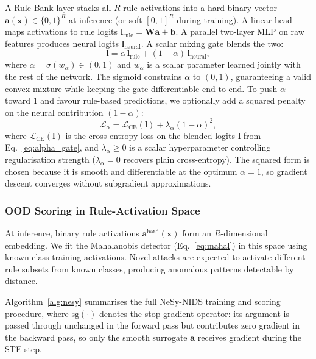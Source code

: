\documentclass[journal]{IEEEtran}
\begin{document}
A Rule Bank layer stacks all $R$ rule activations into a hard binary
vector $\mathbf{a}(\mathbf{x})\in\{0,1\}^R$ at inference (or soft
$[0,1]^R$ during training). A linear head maps activations to rule
logits $\mathbf{l}_{\mathrm{rule}}{=}\mathbf{W}\mathbf{a}{+}\mathbf{b}$.
A parallel two-layer MLP on raw features produces neural logits
$\mathbf{l}_{\mathrm{neural}}$. A scalar mixing gate blends the two:
\begin{equation}
  \mathbf{l} = \alpha\,\mathbf{l}_{\mathrm{rule}} +
               (1{-}\alpha)\,\mathbf{l}_{\mathrm{neural}},
  \label{eq:alpha_gate}
\end{equation}
where $\alpha{=}\sigma(w_\alpha)\in(0,1)$ and $w_\alpha$ is a scalar
parameter learned jointly with the rest of the network. The sigmoid
constrains $\alpha$ to $(0,1)$, guaranteeing a valid convex mixture
while keeping the gate differentiable end-to-end.
To push $\alpha$ toward 1 and favour rule-based predictions, we
optionally add a squared penalty on the neural contribution $(1{-}\alpha)$:
\begin{equation}
  \mathcal{L}_\alpha = \mathcal{L}_{\mathrm{CE}}(\mathbf{l}) +
                       \lambda_\alpha(1{-}\alpha)^2,
  \label{eq:alpha_reg}
\end{equation}
where $\mathcal{L}_{\mathrm{CE}}(\mathbf{l})$ is the cross-entropy loss
on the blended logits $\mathbf{l}$ from Eq.~\ref{eq:alpha_gate}, and
$\lambda_\alpha{\geq}0$ is a scalar hyperparameter controlling
regularisation strength ($\lambda_\alpha{=}0$ recovers plain
cross-entropy). The squared form is chosen because it is smooth and
differentiable at the optimum $\alpha{=}1$, so gradient descent
converges without subgradient approximations.

\subsubsection{OOD Scoring in Rule-Activation Space}

At inference, binary rule activations $\mathbf{a}^{\mathrm{hard}}(\mathbf{x})$
form an $R$-dimensional embedding. We fit the Mahalanobis detector
(Eq.~\ref{eq:mahal}) in this space using known-class training
activations. Novel attacks are expected to activate different rule
subsets from known classes, producing anomalous patterns detectable by
distance.

Algorithm~\ref{alg:nesy} summarises the full NeSy-NIDS training and
scoring procedure, where $\mathrm{sg}(\cdot)$ denotes the stop-gradient
operator: its argument is passed through unchanged in the forward pass
but contributes zero gradient in the backward pass, so only the smooth
surrogate $\mathbf{a}$ receives gradient during the STE step.
\end{document}
